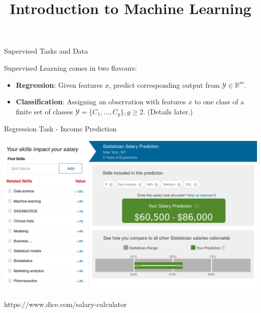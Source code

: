 \documentclass[11pt,compress,t,notes=noshow, xcolor=table]{beamer}
\title{Introduction to Machine Learning}
\institute{\href{https://compstat-lmu.github.io/lecture_i2ml/}{compstat-lmu.github.io/lecture\_i2ml}}
\date{}
\begin{document}
















\begin{frame}{Supervised Tasks and Data}

Supervised Learning comes in two flavours:

\begin{itemize}
\item \textbf{Regression}: Given features $x$, predict corresponding output from $\mathcal{Y} \in \mathbb{R}^m$.
\item \textbf{Classification}: Assigning an observation with features $x$ to one class of a finite set of classes $\mathcal{Y} = \{C_1,...,C_g\}, g \geq 2$. (Details later.)
\end{itemize}

\end{frame}

\begin{vbframe}{Regression Task - Income Prediction} 
\begin{center}
  \includegraphics[width=\textwidth]{figure_man/salary_prediction.png}
\end{center}
\vspace{-0.5cm}
\begin{flushright}
  \tiny https://www.dice.com/salary-calculator
\end{flushright}

\end{vbframe}
\end{document}
